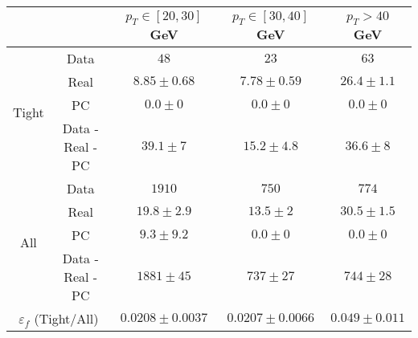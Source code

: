 \small
\begin{tabular}{|c|c||c|c|c|}
\hline
\multicolumn{2}{|c||}{} & $p_{T}\in[20,30]$ GeV & $p_{T}\in[30,40]$ GeV & $p_{T} > 40$ GeV\\ 
\hline
\hline
\multirow{4}{*}{Tight} & Data  &  $48$ &  $23$ &  $63$\\ 
&Real &  $8.85 \pm 0.68$ &  $7.78 \pm 0.59$ &  $26.4 \pm 1.1$\\ 
&PC &  $0.0 \pm 0$ &  $0.0 \pm 0$ &  $0.0 \pm 0$\\ 
\cline{2-5}
&Data - Real - PC &  $39.1 \pm 7$ &  $15.2 \pm 4.8$ &  $36.6 \pm 8$\\ 
\hline \hline
\multirow{4}{*}{All}&Data &  $1910$ &  $750$ &  $774$\\ 
&Real &  $19.8 \pm 2.9$ &  $13.5 \pm 2$ &  $30.5 \pm 1.5$\\ 
&PC &  $9.3 \pm 9.2$ &  $0.0 \pm 0$ &  $0.0 \pm 0$\\ 
\cline{2-5}
&Data - Real - PC&  $1881 \pm 45$ &  $737 \pm 27$ &  $744 \pm 28$\\ 
\hline \hline
\multicolumn{2}{|c||}{$\varepsilon_f$ (Tight/All)} &  $0.0208 \pm 0.0037$ &  $0.0207 \pm 0.0066$ &  $0.049 \pm 0.011$\\ 
\hline
\end{tabular}
